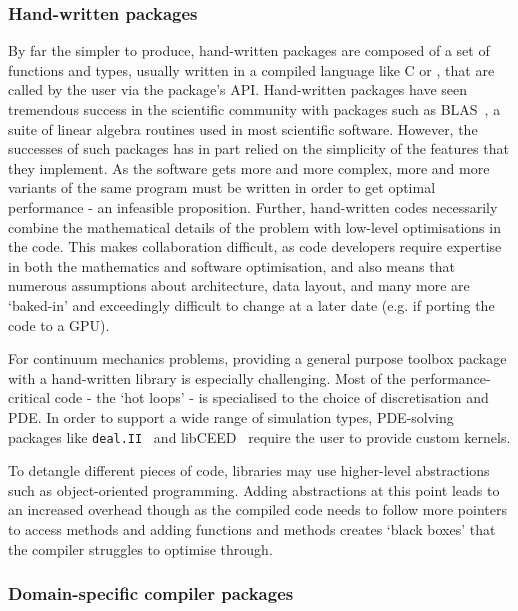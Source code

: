 \documentclass[thesis]{subfiles}
\begin{document}
\subsubsection{Hand-written packages}

By far the simpler to produce, hand-written packages are composed of a set of functions and types, usually written in a compiled language like C or \cplusplus, that are called by the user via the package's API.
Hand-written packages have seen tremendous success in the scientific community with packages such as BLAS~\cite{lawsonBasicLinearAlgebra1979}, a suite of linear algebra routines used in most scientific software.
However, the successes of such packages has in part relied on the simplicity of the features that they implement.
As the software gets more and more complex, more and more variants of the same program must be written in order to get optimal performance - an infeasible proposition.
Further, hand-written codes necessarily combine the mathematical details of the problem with low-level optimisations in the code.
This makes collaboration difficult, as code developers require expertise in both the mathematics and software optimisation, and also means that numerous assumptions about architecture, data layout, and many more are `baked-in' and exceedingly difficult to change at a later date (e.g. if porting the code to a GPU).

For continuum mechanics problems, providing a general purpose toolbox package with a hand-written library is especially challenging.
Most of the performance-critical code - the `hot loops' - is specialised to the choice of discretisation and PDE.
In order to support a wide range of simulation types, PDE-solving packages like \texttt{deal.II}~\cite{dealII95,dealii2019design} and libCEED~\cite{brownLibCEEDFastAlgebra2021} require the user to provide custom kernels.


To detangle different pieces of code, libraries may use higher-level abstractions such as object-oriented programming.
Adding abstractions at this point leads to an increased overhead though as the compiled code needs to follow more pointers to access methods and adding functions and methods creates `black boxes' that the compiler struggles to optimise through.

\subsubsection{Domain-specific compiler packages}
\end{document}
